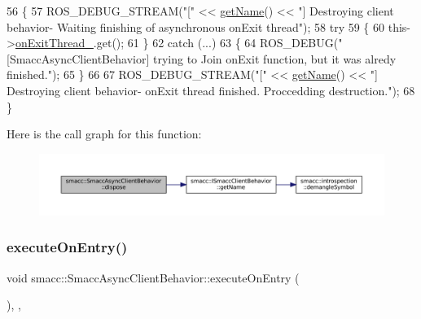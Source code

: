 \begin{DoxyCode}
56     \{
57         ROS\_DEBUG\_STREAM(\textcolor{stringliteral}{"["} << \hyperlink{classsmacc_1_1ISmaccClientBehavior_a18e4bec9460b010f2894c0f7e7064a34}{getName}() << \textcolor{stringliteral}{"] Destroying client behavior- Waiting finishing of
       asynchronous onExit thread"});
58         \textcolor{keywordflow}{try}
59         \{
60             this->\hyperlink{classsmacc_1_1SmaccAsyncClientBehavior_af76d1c36b4a10425f2da043545b73299}{onExitThread\_}.get();
61         \}
62         \textcolor{keywordflow}{catch} (...)
63         \{
64             ROS\_DEBUG(\textcolor{stringliteral}{"[SmaccAsyncClientBehavior] trying to Join onExit function, but it was alredy
       finished."});
65         \}
66 
67         ROS\_DEBUG\_STREAM(\textcolor{stringliteral}{"["} << \hyperlink{classsmacc_1_1ISmaccClientBehavior_a18e4bec9460b010f2894c0f7e7064a34}{getName}() << \textcolor{stringliteral}{"] Destroying client behavior-  onExit thread finished.
       Proccedding destruction."});
68     \}
\end{DoxyCode}
Here is the call graph for this function\+:
\nopagebreak
\begin{figure}[H]
\begin{center}
\leavevmode
\includegraphics[width=350pt]{classsmacc_1_1SmaccAsyncClientBehavior_af475cee853947a8d3f513c7fb9789e7a_cgraph}
\end{center}
\end{figure}
\mbox{\label{classsmacc_1_1SmaccAsyncClientBehavior_ab8ca63d40d61554263466fe4c0b5cbd1}} 
\subsubsection{\texorpdfstring{execute\+On\+Entry()}{executeOnEntry()}}
{\footnotesize\ttfamily void smacc\+::\+Smacc\+Async\+Client\+Behavior\+::execute\+On\+Entry (\begin{DoxyParamCaption}{ }\end{DoxyParamCaption})\hspace{0.3cm}{\ttfamily [override]}, {\ttfamily [protected]}, {\ttfamily [virtual]}}



